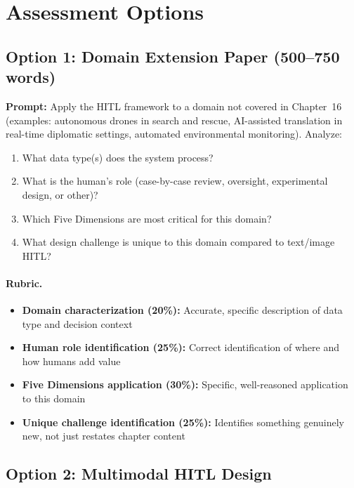 \section{Assessment Options}

\subsection{Option 1: Domain Extension Paper (500--750 words)}

\textbf{Prompt:} Apply the HITL framework to a domain not covered in Chapter~16 (examples: autonomous drones in search and rescue, AI-assisted translation in real-time diplomatic settings, automated environmental monitoring). Analyze:
\begin{enumerate}
    \item What data type(s) does the system process?
    \item What is the human's role (case-by-case review, oversight, experimental design, or other)?
    \item Which Five Dimensions are most critical for this domain?
    \item What design challenge is unique to this domain compared to text/image HITL?
\end{enumerate}

\paragraph{Rubric.}
\begin{itemize}
    \item \textbf{Domain characterization (20\%):} Accurate, specific description of data type and decision context
    \item \textbf{Human role identification (25\%):} Correct identification of where and how humans add value
    \item \textbf{Five Dimensions application (30\%):} Specific, well-reasoned application to this domain
    \item \textbf{Unique challenge identification (25\%):} Identifies something genuinely new, not just restates chapter content
\end{itemize}

\subsection{Option 2: Multimodal HITL Design}

